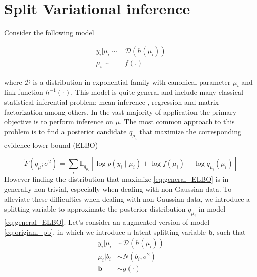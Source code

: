 






\newpage
\section{Split Variational inference}\label{sec:split_VA_sup}
Consider the following model

\begin{align}\label{eq:origianl_pb}
 y_{ i }|  \mu_{i}\sim &\mathcal{D}\left(h ( \mu_{i })\right) \\
 \mu_{i } \sim & f(.) 
\end{align} 

where $\mathcal{D}$ is a distribution in exponential family with canonical parameter $ \mu_{i }$ and link function
$h^{-1}(·)$. This model is quite   general and  include many classical statistical inferential problem: mean inference \citep{stephens_false_2017,urbut_flexible_2019}, regression \citep{kim_flexible_2022,bai_spike-and-slab_2021} and matrix factorization  \citep{wang_empirical_2021} among others.  In the vast majority of application the primary objective is to perform inference on $\mu$. The most common approach to this problem is to find a posterior candidate $q_{\mu_i}$ that maximize the corresponding evidence lower bound (ELBO)


 
\begin{equation}\label{eq:general_ELBO}
    \tilde{F}(q_{\mu}; \sigma^2)
    = \sum_i \mathbb{E}_{q_{\mu_i}}\!\left[
        \log p(y_i\mid\mu_i)+\log f(\mu_i)-\log q_{\mu_i}(\mu_i)
      \right]
\end{equation}
 However finding the distribution that maximize \ref{eq:general_ELBO}   is in generally non-trivial, especially when dealing  with non-Gaussian data. To alleviate these difficulties when dealing with non-Gaussian data, we introduce a splitting variable to approximate the posterior distribution $q_{\mu_i}$ in model  \ref{eq:general_ELBO}. Let's consider an   augmented version of model  \ref{eq:origianl_pb}, in which we introduce a  latent splitting variable $\mathbf{b}$, such that
\begin{align}\label{eq:split_example_supp}
    y_i|\mu_{i }& \sim \mathcal{D}(h(\mu_{i })) \\
    \mu_{i }|b_i &\sim N(b_i, \sigma^2)\\
    \mathbf{b} &\sim g(\cdot)
\end{align}
 

